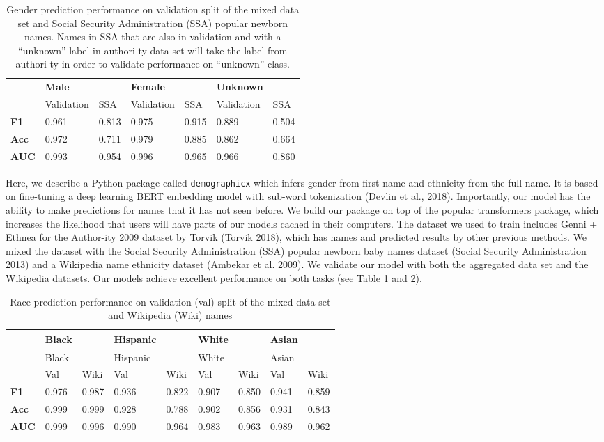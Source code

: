 \documentclass[]{article}
\begin{document}
\begin{longtable}[]{@{}lllllll@{}}
\caption{Gender prediction performance on validation split of the mixed
data set and Social Security Administration (SSA) popular newborn names.
Names in SSA that are also in validation and with a ``unknown'' label in
authori-ty data set will take the label from authori-ty in order to
validate performance on ``unknown'' class.}\tabularnewline
\toprule
\endhead
& \textbf{Male} & & \textbf{Female} & & \textbf{Unknown}
&\tabularnewline
& Validation & SSA & Validation & SSA & Validation & SSA\tabularnewline
\textbf{F1} & 0.961 & 0.813 & 0.975 & 0.915 & 0.889 &
0.504\tabularnewline
\textbf{Acc} & 0.972 & 0.711 & 0.979 & 0.885 & 0.862 &
0.664\tabularnewline
\textbf{AUC} & 0.993 & 0.954 & 0.996 & 0.965 & 0.966 &
0.860\tabularnewline
\bottomrule
\end{longtable}

Here, we describe a Python package called \texttt{demographicx} which
infers gender from first name and ethnicity from the full name. It is
based on fine-tuning a deep learning BERT embedding model with sub-word
tokenization (Devlin et al., 2018). Importantly, our model has the
ability to make predictions for names that it has not seen before. We
build our package on top of the popular transformers package, which
increases the likelihood that users will have parts of our models cached
in their computers. The dataset we used to train includes Genni + Ethnea
for the Author-ity 2009 dataset by Torvik (Torvik 2018), which has names
and predicted results by other previous methods. We mixed the dataset
with the Social Security Administration (SSA) popular newborn baby names
dataset (Social Security Administration 2013) and a Wikipedia name
ethnicity dataset (Ambekar et al. 2009). We validate our model with both
the aggregated data set and the Wikipedia datasets. Our models achieve
excellent performance on both tasks (see Table 1 and 2).

\begin{longtable}[]{@{}lllllllll@{}}
\caption{Race prediction performance on validation (val) split of the
mixed data set and Wikipedia (Wiki) names}\tabularnewline
\toprule
& Black & & Hispanic & & White & & Asian &\tabularnewline
\midrule
\endfirsthead
\toprule
& Black & & Hispanic & & White & & Asian &\tabularnewline
\midrule
\endhead
& Val & Wiki & Val & Wiki & Val & Wiki & Val & Wiki\tabularnewline
\textbf{F1} & 0.976 & 0.987 & 0.936 & 0.822 & 0.907 & 0.850 & 0.941 &
0.859\tabularnewline
\textbf{Acc} & 0.999 & 0.999 & 0.928 & 0.788 & 0.902 & 0.856 & 0.931 &
0.843\tabularnewline
\textbf{AUC} & 0.999 & 0.996 & 0.990 & 0.964 & 0.983 & 0.963 & 0.989 &
0.962\tabularnewline
\bottomrule
\end{longtable}
\end{document}
